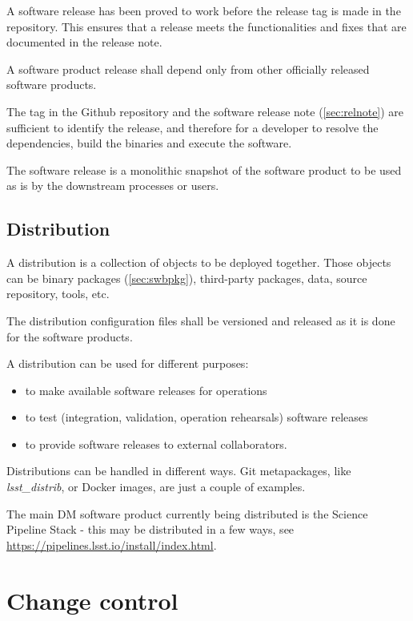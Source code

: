 A software release has been proved to work before the release tag is made in the repository.
This ensures that a release meets the functionalities and fixes that are documented in the release note.

A software product release shall depend only from other officially released software products.

The tag in the Github repository and the software release note (\ref{sec:relnote}) are sufficient to identify the release, 
and therefore for a developer to resolve the dependencies, build the binaries and execute the software.

The software release is a monolithic snapshot of the software product to be used as is by the downstream processes or users.


\subsection{Distribution} \label{sec:distribution}

A distribution is a collection of objects to be deployed together.
Those objects can be binary packages (\ref{sec:swbpkg}), third-party packages, data, source repository, tools, etc.

The distribution configuration files shall be versioned and released as it is done for the software products.

A distribution can be used for different purposes:

\begin{itemize}
\item to make available software releases for operations
\item to test (integration, validation, operation rehearsals) software releases
\item to provide software releases to external collaborators.
\end{itemize}

Distributions can be handled in different ways.
Git metapackages, like \textit{lsst\_distrib}, or Docker images, are just a couple of examples.

The main DM software product currently being distributed is the Science Pipeline Stack -
this may be distributed in a few ways, see \url{https://pipelines.lsst.io/install/index.html}.


\newpage
\section{Change control} \label{sec:changecontrol}

